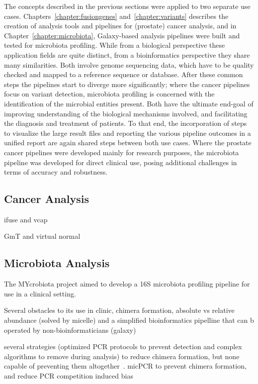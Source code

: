 The concepts described in the previous sections were applied to two separate use cases. Chapters~\ref{chapter:fusiongenes} and~\ref{chapter:variants} describes the creation of analysis tools and pipelines for (prostate) cancer analysis, and in Chapter~\ref{chapter:microbiota}, Galaxy-based analysis pipelines were built and tested for microbiota profiling. While from a biological perspective these application fields are quite distinct, from a bioinformatics perspective they share many similarities. Both involve genome sequencing data, which have to be quality checked and mapped to a reference sequence or database. After these common steps the pipelines start to diverge more significantly; where the cancer pipelines focus on variant detection, microbiota profiling is concerned with the identification of the microbial entities present. Both have the ultimate end-goal of improving understanding of the biological mechanisms involved, and facilitating the diagnosis and treatment of patients. To that end, the incorporation of steps to visualize the large result files and reporting the various pipeline outcomes in a unified report are again shared steps between both use cases. Where the prostate cancer pipelines were developed mainly for research purposes, the microbiota pipeline was developed for direct clinical use, posing additional challenges in terms of accuracy and robustness.


\subsection{Cancer Analysis}
ifuse and vcap

GmT and virtual normal


\subsection{Microbiota Analysis}
The MYcrobiota project aimed to develop a 16S microbiota profiling pipeline for use in a clinical setting.

Several obstacles to its use in clinic, chimera formation,  absolute vs relative abundance (solved by micelle) and a simplified bioinformatics pipelline that can b operated by non-bioinformaticians (galaxy)

several strategies (optimized PCR protocols to prevent detection and complex algorithms to remove during analysis) to reduce chimera formation, but none capable of preventing them altogether~\cite{huttenhower2012structure}. micPCR to prevent chimera formation, and reduce PCR competition induced bias

